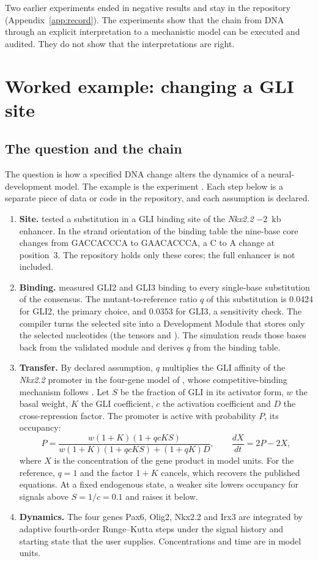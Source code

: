 \documentclass[10.5pt,a4paper]{article}
\begin{document}
Two earlier experiments ended in negative results and stay in the repository (Appendix~\ref{app:record}). The experiments show that the chain from DNA through an explicit interpretation to a mechanistic model can be executed and audited. They do not show that the interpretations are right.

\section{Worked example: changing a GLI site}\label{sec:example}

\subsection{The question and the chain}

The question is how a specified DNA change alters the dynamics of a neural-development model. The example is the experiment . Each step below is a separate piece of data or code in the repository, and each assumption is declared.

\begin{enumerate}
\item \textbf{Site.} \citet{peterson2012} tested a substitution in a GLI binding site of the \emph{Nkx2.2} $-2$~kb enhancer. In the strand orientation of the binding table the nine-base core changes from GACCACCCA to GAACACCCA, a C to A change at position~3. The repository holds only these cores; the full enhancer is not included.
\item \textbf{Binding.} \citet{hallikas2006} measured GLI2 and GLI3 binding to every single-base substitution of the consensus. The mutant-to-reference ratio $q$ of this substitution is 0.0424 for GLI2, the primary choice, and 0.0353 for GLI3, a sensitivity check. The compiler turns the selected site into a Development Module that stores only the selected nucleotides (the tensors  and ). The simulation reads those bases back from the validated module and derives $q$ from the binding table.
\item \textbf{Transfer.} By declared assumption, $q$ multiplies the GLI affinity of the \emph{Nkx2.2} promoter in the four-gene model of \citet{herreradelgado2020}, whose competitive-binding mechanism follows \citet{cohen2014}. Let $S$ be the fraction of GLI in its activator form, $w$ the basal weight, $K$ the GLI coefficient, $c$ the activation coefficient and $D$ the cross-repression factor. The promoter is active with probability $P$, its occupancy:
\[
P=\frac{w(1+K)(1+qcKS)}{w(1+K)(1+qcKS)+(1+qK)D},\qquad \frac{dX}{dt}=2P-2X,
\]
where $X$ is the concentration of the gene product in model units. For the reference, $q=1$ and the factor $1+K$ cancels, which recovers the published equations. At a fixed endogenous state, a weaker site lowers occupancy for signals above \mbox{$S=1/c=0.1$} and raises it below.
\item \textbf{Dynamics.} The four genes Pax6, Olig2, Nkx2.2 and Irx3 are integrated by adaptive fourth-order Runge–Kutta steps under the signal history and starting state that the user supplies. Concentrations and time are in model units.
\end{enumerate}
\end{document}
